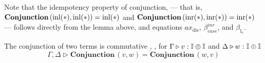   Note that the idempotency property of conjunction, --- that is, $ \textbf{Conjunction} \, (\mathrm{inl}(*), \mathrm{inl}(*)) = \mathrm{inl}(*)$ and  $ \textbf{Conjunction} \, (\mathrm{inr}(*), \mathrm{inr}(*)) = \mathrm{inr}(*)$ ---   follows directly from the lemma above, and equations $ax_\text{dis}$, $\beta_{case}^{inr}$, and $\beta_{\mathbb{I}_{e}}$.


\begin{proposition} \label{lem:comm}
  The conjunction of two terms is commutative , \ie, for $ \Gamma \triangleright v: \mathbb{I} \oplus \mathbb{I}$ and $ \Delta \triangleright w: \mathbb{I} \oplus \mathbb{I}$ 
 $$  \Gamma, \Delta \triangleright \textbf{Conjunction} \, (v,w) = \textbf{Conjunction} \, (w,v)  $$ 
\end{proposition}




